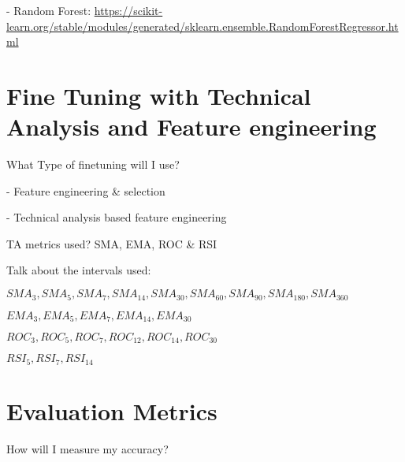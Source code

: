 \documentclass[12pt]{report} %
\begin{document}




- Random Forest: \url{https://scikit-learn.org/stable/modules/generated/sklearn.ensemble.RandomForestRegressor.html}




\section{Fine Tuning with Technical Analysis and Feature engineering}
What Type of finetuning will I use?

- Feature engineering \& selection

- Technical analysis based feature engineering
    
    TA metrics used? SMA, EMA, ROC \& RSI

    Talk about the intervals used:
    
    $ SMA_3,SMA_5,SMA_7,SMA_{14},SMA_{30},SMA_{60},SMA_{90},SMA_{180},SMA_{360} $
    
    $ EMA_3,EMA_5,EMA_7,EMA_{14},EMA_{30} $
    
    $ ROC_3,ROC_5,ROC_7,ROC_{12},ROC_{14},ROC_{30} $
    
    $ RSI_5,RSI_7,RSI_{14} $

\section{Evaluation Metrics}
How will I measure my accuracy?
\end{document}

